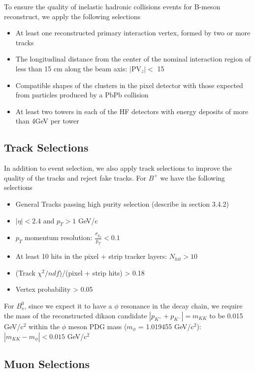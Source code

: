 To ensure the quality of inelastic hadronic collisions events for B-meson reconstruct, we apply the following selections


\begin{itemize}
\item At least one reconstructed primary interaction vertex, formed by two or more tracks
\item The longitudinal distance from the center of the nominal interaction region of less than 15 cm along the beam axis: $|$PV$_{z}$$| < $ 15
\item Compatible shapes of the clusters in the pixel detector with those expected from particles produced by a PbPb collision \cite{EvtSel}
\item At least two towers in each of the HF detectors with energy deposits of more than 4GeV per tower  
\end{itemize}

\subsection{Track Selections}

In addition to event selection, we also apply track selections to improve the quality of the tracks and reject fake tracks. For $B^+$ we have the following selections

\begin{itemize}
\item General Tracks passing high purity selection (describe in section 3.4.2)
\item $|\eta| < 2.4$ and $p_T > 1$ GeV/c
\item $p_T$ momentum resolution: $\frac{\sigma_{p_T}}{p_T} < 0.1$
\item At least 10 hits in the pixel + strip tracker layers: $N_{hit} > 10$
\item (Track $\chi^2/ndf$)/(pixel + strip hits) > 0.18
\item Vertex probability > 0.05
\end{itemize}

For $B^0_s$, since we expect it to have a $\phi$ resonance in the decay chain, we require the mass of the reconstructed dikaon candidate $|p_{K^+} + p_{K^-}| = m_{KK}$ to be 0.015 GeV/c$^2$ within the $\phi$ meson PDG mass ($m_\phi$ = 1.019455 GeV/c$^2$): $|m_{KK} - m_\phi| < 0.015$ GeV/c$^2$

\subsection{Muon Selections}

